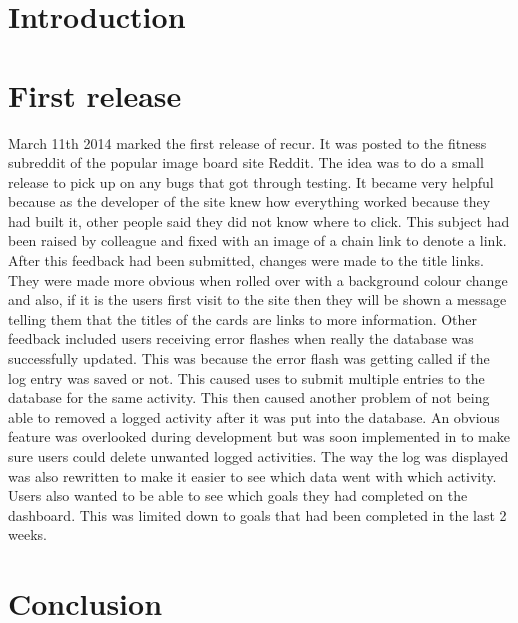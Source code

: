 \section{Introduction}

\section{First release}
March 11th 2014 marked the first release of recur. It was posted to the fitness subreddit of the popular image board site Reddit\citep{reddit:2005}. The idea was to do a small release to pick up on any bugs that got through testing. It became very helpful because as the developer of the site knew how everything worked because they had built it, other people said they did not know where to click. This subject had been raised by colleague and fixed with an image of a chain link to denote a link. After this feedback had been submitted, changes were made to the title links. They were made more obvious when rolled over with a background colour change and also, if it is the users first visit to the site then they will be shown a message telling them that the titles of the cards are links to more information. Other feedback included users receiving error flashes when really the database was successfully updated. This was because the error flash was getting called if the log entry was saved or not. This caused uses to submit multiple entries to the database for the same activity. This then caused another problem of not being able to removed a logged activity after it was put into the database. An obvious feature was overlooked during development but was soon implemented in to make sure users could delete unwanted logged activities. The way the log was displayed was also rewritten to make it easier to see which data went with which activity. Users also wanted to be able to see which goals they had completed on the dashboard. This was limited down to goals that had been completed in the last 2 weeks.


\section{Conclusion}